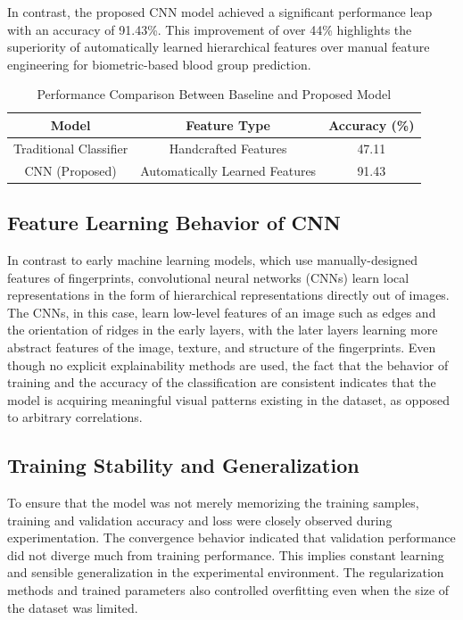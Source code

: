 \documentclass[conference]{IEEEtran}
\begin{document}
In contrast, the proposed CNN model achieved a significant performance leap with an accuracy of 91.43\%. This improvement of over 44\% highlights the superiority of automatically learned hierarchical features over manual feature engineering for biometric-based blood group prediction.

\begin{table}[htbp]
\centering
\caption{Performance Comparison Between Baseline and Proposed Model}
\label{tab:performance}
\renewcommand{\arraystretch}{1.2}
\setlength{\tabcolsep}{6pt}
\begin{tabular}{|c|c|c|}
\hline
\textbf{Model} & \textbf{Feature Type} & \textbf{Accuracy (\%)} \\
\hline
Traditional Classifier & Handcrafted Features & 47.11 \\
CNN (Proposed) & Automatically Learned Features & 91.43 \\
\hline
\end{tabular}
\end{table}

\subsection{Feature Learning Behavior of CNN}
In contrast to early machine learning models, which use manually-designed features of fingerprints, convolutional neural networks (CNNs) learn local representations in the form of hierarchical representations directly out of images. The CNNs, in this case, learn low-level features of an image such as edges and the orientation of ridges in the early layers, with the later layers learning more abstract features of the image, texture, and structure of the fingerprints. Even though no explicit explainability methods are used, the fact that the behavior of training and the accuracy of the classification are consistent indicates that the model is acquiring meaningful visual patterns existing in the dataset, as opposed to arbitrary correlations.

\subsection{Training Stability and Generalization}
To ensure that the model was not merely memorizing the training samples, training and validation accuracy and loss were closely observed during experimentation. The convergence behavior indicated that validation performance did not diverge much from training performance. This implies constant learning and sensible generalization in the experimental environment. The regularization methods and trained parameters also controlled overfitting even when the size of the dataset was limited.
\end{document}

